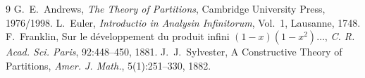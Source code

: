 \documentclass[11pt,a4paper]{article}
\begin{document}
\begin{thebibliography}{9}
G.~E.~Andrews, \emph{The Theory of Partitions}, Cambridge University Press, 1976/1998.
L.~Euler, \emph{Introductio in Analysin Infinitorum}, Vol.~1, Lausanne, 1748.
F.~Franklin, Sur le d{\'e}veloppement du produit infini $(1-x)(1-x^2)\dots$, \emph{C. R. Acad. Sci. Paris}, 92:448--450, 1881.
J.~J.~Sylvester, A Constructive Theory of Partitions, \emph{Amer. J. Math.}, 5(1):251--330, 1882.
\end{thebibliography}
\end{document}
